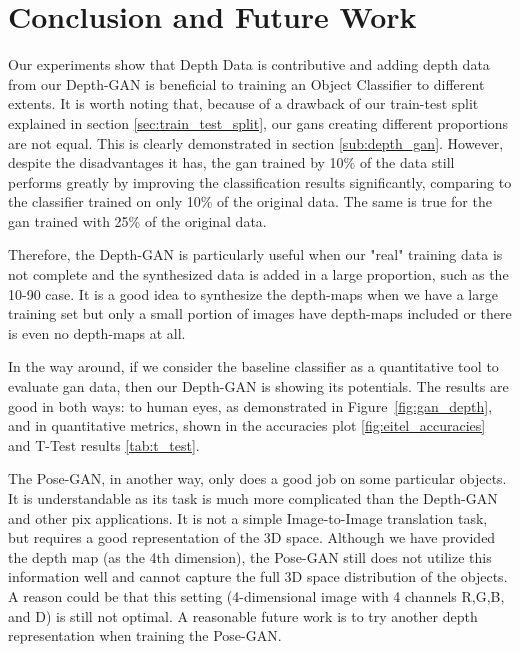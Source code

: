 
\chapter{Conclusion and Future Work \label{cha:conclusion}}

Our experiments show that Depth Data is contributive and adding depth data
from our Depth-GAN is beneficial to training an Object Classifier to different extents. 
It is worth noting that, because of a drawback of our train-test split explained in
section \ref{sec:train_test_split}, our \acrshort{gan}s creating different proportions
are not equal. This is clearly demonstrated in section \ref{sub:depth_gan}. However,
despite the disadvantages it has, the \acrshort{gan} trained by 10\% of the data still
performs greatly by improving the classification results significantly, comparing to the
classifier trained on only 10\% of the original data. The same is true for the
\acrshort{gan} trained with 25\% of the original data.

Therefore, the Depth-GAN is particularly useful when our "real" training data is not
complete and the synthesized data is added in a large proportion, such as the 10-90 case.
It is a good idea to synthesize the depth-maps when we have a large training set but only
a small portion of images have depth-maps included or there is even no depth-maps at all.

In the way around, if we consider the baseline classifier as a quantitative tool to
evaluate \acrshort{gan} data, then our Depth-GAN is showing its potentials. The results
are good in both ways: to human eyes, as demonstrated in Figure~\ref{fig:gan_depth}, and
in quantitative metrics, shown in the accuracies plot \ref{fig:eitel_accuracies} and
T-Test results \ref{tab:t_test}.

The Pose-GAN, in another way, only does a good job on some particular objects. It is
understandable as its task is much more complicated than the Depth-GAN and other
\acrshort{pix} applications. It is not a simple Image-to-Image translation task, but
requires a good representation of the 3D space. Although we have provided the depth map
(as the 4th dimension), the Pose-GAN still does not utilize this information well and
cannot capture the full 3D space distribution of the objects. A reason could be that this
setting (4-dimensional image with 4 channels R,G,B, and D) is still not optimal. A
reasonable future work is to try another depth representation when training the Pose-GAN.

